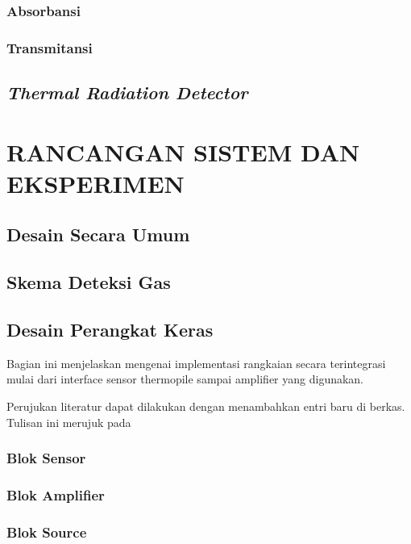 \documentclass[12pt,a4paper]{report}
\begin{document}
	\subsection{Absorbansi}
		
	\subsection{Transmitansi}
		
	\section{\textit{Thermal Radiation Detector}}
		
\chapter{RANCANGAN SISTEM DAN EKSPERIMEN}
	\section{Desain Secara Umum}
			
	\section{Skema Deteksi Gas}
		
	\section{Desain Perangkat Keras}
	Bagian ini menjelaskan mengenai implementasi rangkaian secara terintegrasi mulai dari interface sensor thermopile sampai amplifier yang digunakan.

	Perujukan literatur dapat dilakukan dengan menambahkan entri baru di berkas. Tulisan ini merujuk pada \parencite{knuth2001art}
		
	\subsection{Blok Sensor}
		
	\subsection{Blok Amplifier}
			
	\subsection{Blok Source}
			
\end{document}
